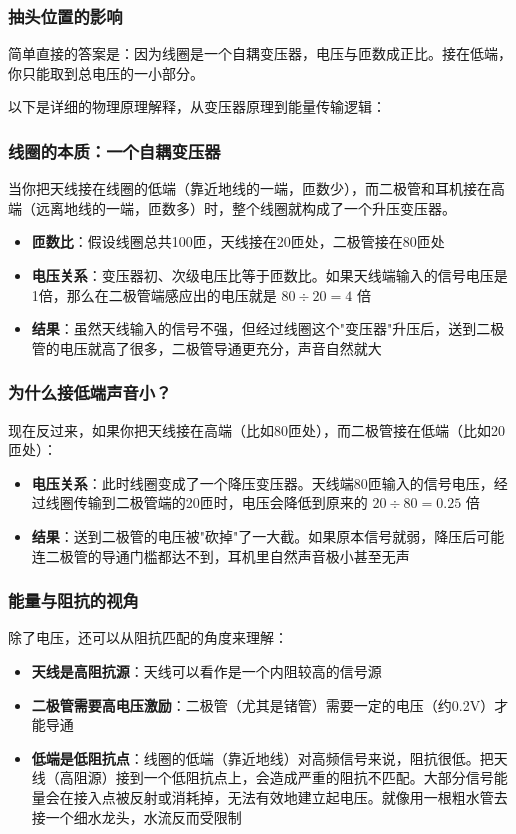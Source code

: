 \documentclass[12pt,UTF8]{ctexbook}
\begin{document}
\subsubsection{抽头位置的影响}

简单直接的答案是：因为线圈是一个自耦变压器，电压与匝数成正比。接在低端，你只能取到总电压的一小部分。

以下是详细的物理原理解释，从变压器原理到能量传输逻辑：

\subsubsection{线圈的本质：一个自耦变压器}

当你把天线接在线圈的低端（靠近地线的一端，匝数少），而二极管和耳机接在高端（远离地线的一端，匝数多）时，整个线圈就构成了一个升压变压器。
\begin{itemize}[leftmargin=3.5em]
	\item \textbf{匝数比}：假设线圈总共100匝，天线接在20匝处，二极管接在80匝处
	\item \textbf{电压关系}：变压器初、次级电压比等于匝数比。如果天线端输入的信号电压是1倍，那么在二极管端感应出的电压就是 $80 \div 20 = 4$ 倍
	\item \textbf{结果}：虽然天线输入的信号不强，但经过线圈这个"变压器"升压后，送到二极管的电压就高了很多，二极管导通更充分，声音自然就大
\end{itemize}

\subsubsection{为什么接低端声音小？}

现在反过来，如果你把天线接在高端（比如80匝处），而二极管接在低端（比如20匝处）：
\begin{itemize}[leftmargin=3.5em]
	\item \textbf{电压关系}：此时线圈变成了一个降压变压器。天线端80匝输入的信号电压，经过线圈传输到二极管端的20匝时，电压会降低到原来的 $20 \div 80 = 0.25$ 倍
	\item \textbf{结果}：送到二极管的电压被"砍掉"了一大截。如果原本信号就弱，降压后可能连二极管的导通门槛都达不到，耳机里自然声音极小甚至无声
\end{itemize}

\subsubsection{能量与阻抗的视角}

除了电压，还可以从阻抗匹配的角度来理解：
\begin{itemize}[leftmargin=3.5em]
	\item \textbf{天线是高阻抗源}：天线可以看作是一个内阻较高的信号源
	\item \textbf{二极管需要高电压激励}：二极管（尤其是锗管）需要一定的电压（约0.2V）才能导通
	\item \textbf{低端是低阻抗点}：线圈的低端（靠近地线）对高频信号来说，阻抗很低。把天线（高阻源）接到一个低阻抗点上，会造成严重的阻抗不匹配。大部分信号能量会在接入点被反射或消耗掉，无法有效地建立起电压。就像用一根粗水管去接一个细水龙头，水流反而受限制
\end{itemize}
\end{document}
